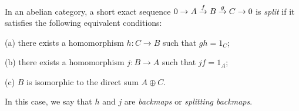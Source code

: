 \documentclass{article}
\begin{document}
In an abelian category, a short exact sequence
$0 \to A \buildrel f \over \to B \buildrel g \over \to C \to 0$
is {\it split}
if it satisfies the following equivalent conditions:

(a) there exists a homomorphism $h : C \to B$ such that $gh = 1_C$;

(b) there exists a homomorphism $j : B \to A$ such that $jf = 1_A$;

(c) $B$ is isomorphic to the direct sum $A \oplus C$.

In this case, we say that $h$ and $j$ 
are {\it backmaps} or {\it splitting backmaps}.
\end{document}
